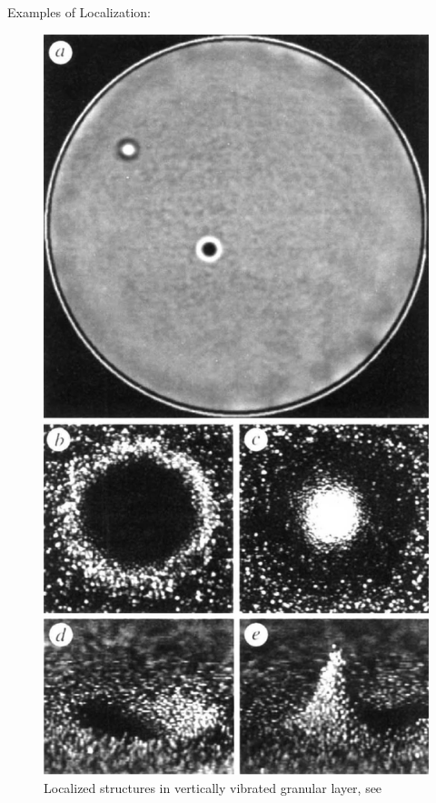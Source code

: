 \documentclass{beamer}
\begin{document}
\begin{frame}{Examples of Localization:}
\begin{figure}[ht]
  \centering
  \includegraphics[scale=0.2]
  {Figs/oscillons_granular_medium.png}  
  \caption{Localized structures in vertically vibrated granular layer, see \cite{umbanhowar1996localized}}
  \label{fig:oscillons_granular_medium}
\end{figure}
\end{frame}
\end{document}
